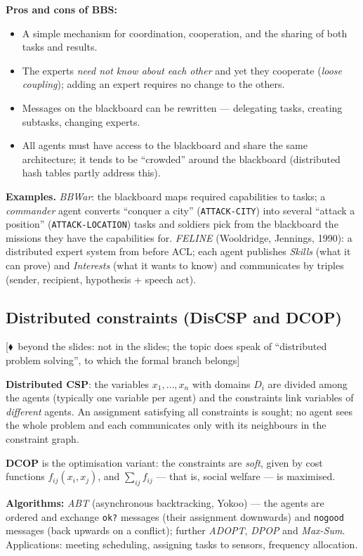 \documentclass[11pt,a4paper]{article}
\theoremstyle{definition}
\providecommand{\uv}[1]{``#1''}
\newcommand{\mimoq}[1]{\textcolor{markcol}{\textsf{\footnotesize[$\blacklozenge$~beyond the slides: #1]}}}
\begin{document}
\textbf{Pros and cons of BBS:}
\begin{itemize}
\item[$+$] A simple mechanism for coordination, cooperation, and the sharing of both tasks and
  results.
\item[$+$] The experts \emph{need not know about each other} and yet they cooperate (\emph{loose
  coupling}); adding an expert requires no change to the others.
\item[$+$] Messages on the blackboard can be rewritten --- delegating tasks, creating subtasks,
  changing experts.
\item[$-$] All agents must have access to the blackboard and share the same architecture; it tends to
  be \uv{crowded} around the blackboard (distributed hash tables partly address this).
\end{itemize}

\medskip
\noindent\textbf{Examples.} \emph{BBWar}: the blackboard maps required capabilities to tasks; a
\emph{commander} agent converts \uv{conquer a city} (\texttt{ATTACK-CITY}) into several
\uv{attack a position} (\texttt{ATTACK-LOCATION}) tasks and soldiers pick from the blackboard
the missions they have the capabilities for. \emph{FELINE} (Wooldridge, Jennings, 1990): a
distributed expert system from before ACL; each agent publishes \emph{Skills} (what it can
prove) and \emph{Interests} (what it wants to know) and communicates by triples
(sender, recipient, hypothesis + speech act).

\subsection{Distributed constraints (DisCSP and DCOP)}

\noindent\mimoq{not in the slides; the topic does speak of \uv{distributed problem solving},
to which the formal branch belongs}

\begin{defbox}
\textbf{Distributed CSP}: the variables $x_1,\dots,x_n$ with domains $D_i$ are divided among the
agents (typically one variable per agent) and the constraints link variables of \emph{different}
agents. An assignment satisfying all constraints is sought; no agent sees the whole problem and
each communicates only with its neighbours in the constraint graph.

\textbf{DCOP} is the optimisation variant: the constraints are \emph{soft}, given by cost
functions $f_{ij}(x_i,x_j)$, and $\sum_{ij} f_{ij}$ --- that is, social welfare --- is maximised.

\textbf{Algorithms:} \emph{ABT} (asynchronous backtracking, Yokoo) --- the agents are ordered and
exchange \texttt{ok?} messages (their assignment downwards) and \texttt{nogood} messages (back
upwards on a conflict); further \emph{ADOPT}, \emph{DPOP} and \emph{Max-Sum}.
Applications: meeting scheduling, assigning tasks to sensors, frequency allocation.
\end{defbox}
\end{document}

